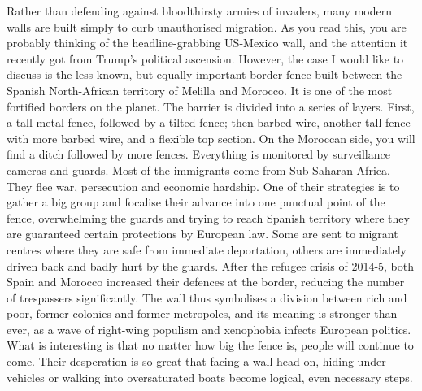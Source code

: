    Rather than defending against bloodthirsty armies of invaders, many
   modern walls are built simply to curb unauthorised migration. As you
   read this, you are probably thinking of the headline-grabbing US-Mexico
   wall, and the attention it recently got from Trump's political
   ascension. However, the case I would like to discuss is the less-known,
   but equally important border fence built between the Spanish
   North-African territory of Melilla and Morocco. It is one of the most
   fortified borders on the planet. The barrier is divided into a series
   of layers. First, a tall metal fence, followed by a tilted fence; then
   barbed wire, another tall fence with more barbed wire, and a flexible
   top section. On the Moroccan side, you will find a ditch followed by
   more fences. Everything is monitored by surveillance cameras and
   guards. Most of the immigrants come from Sub-Saharan Africa. They flee
   war, persecution and economic hardship. One of their strategies is to
   gather a big group and focalise their advance into one punctual point
   of the fence, overwhelming the guards and trying to reach Spanish
   territory where they are guaranteed certain protections by European
   law. Some are sent to migrant centres where they are safe from
   immediate deportation, others are immediately driven back and badly
   hurt by the guards. After the refugee crisis of 2014-5, both Spain and
   Morocco increased their defences at the border, reducing the number of
   trespassers significantly. The wall thus symbolises a division between
   rich and poor, former colonies and former metropoles, and its meaning
   is stronger than ever, as a wave of right-wing populism and xenophobia
   infects European politics. What is interesting is that no matter how
   big the fence is, people will continue to come. Their desperation is so
   great that facing a wall head-on, hiding under vehicles or walking into
   oversaturated boats become logical, even necessary steps.

